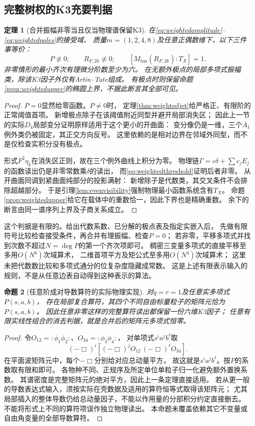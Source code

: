 \documentclass[11pt,a4paper]{ctexart}
\theoremstyle{cnplain}\newtheorem{theorem}{定理}[section]
\newtheorem{proposition}[theorem]{命题}
\theoremstyle{definition}\newtheorem{definition}[theorem]{定义}
\theoremstyle{remark}\newtheorem{remark}[theorem]{注}
\begin{document}
\subsection{完整树权的K3充要判据}
\begin{theorem}[合并振幅非零当且仅当物理谱保留K3]\label{thm:weightediff}
在\eqref{eq:weightedamplitude}--\eqref{eq:weightedpoles}的接受域、
质量$m=(1,2,4,8)$及任意正偶数维下，以下三件事等价：
\[
 P\not\equiv0;\qquad
 R_{F,2k}\not\equiv0;\qquad
 [M_{\mathrm{fun}}(R_{F,2k}):T_X]=1.
\]
非零情形的最小齐次有理微分阶数至少为六。
在无额外极点的局部多项式振幅类，除该K3因子外仅有Artin--Tate组成。
有极点时则保留命题\ref{prop:weightedupper}的椭圆上界，不据此断言其全部可见。
\end{theorem}
\begin{proof}
$P=0$显然给零函数。$P\ne0$时，
定理\ref{thm:weightedjet}给严格正、有限阶的正常阈值首项。
新增极点除子在该阈值附近同型并避开局部消失区；
因此上一节的实际$D_4$局部变分证明原样适用于这个更小的开曲面：
变分像仍是一维，三个$A_1$例外类仍被固定，其正交方向反号。
这里依赖的是相对边界在邻域外同型，而不是仅检查实积分没有极点。

形式$F^2\eta_k$在消失区正则，故在三个例外曲线上积分为零。
物理链$\Gamma=c\delta+\sum c_jE_j$的函数读出仍是非零常数乘$\delta$的读出，
而\eqref{eq:weightedthreshold}证明后者非零。
从开曲面同调到紧曲面纯部分的投影满射：
新增除子是代数类，其交叉条件不会排除超越部分。
于是引理\ref{lem:evenvisibility}强制物理最小函数系统含有$T_X$。
命题\ref{prop:weightedupper}给它在载体中的重数恰一，因此下界也是精确重数。
余下的断言由同一谱序列上界及子商关系成立。
\end{proof}

这个判据是有限的。给出代数系数、已分解的极点表及指定实嵌入后，
先做有限符号比较检查接受条件，再合并有理振幅、检查$P=0$；
若非零，平移多项式并找到次数不超过$N=\deg P$的第一个齐次项即可。
稠密三变量多项式的直接平移至多用$O(N^6)$次域算术，
二维首项平方及矩公式至多用$O(N^4)$次域算术；
这里未把代数数比较和多项式通分的位复杂度隐藏成常数。
这是上述有限表示输入的规则，不是从任意边表自动得到这种表示的算法。

\begin{proposition}[任意阶成对导数算符的实际物理实现]\label{prop:weightedoperator}
对$q=r=1$及任意实多项式$P(s,a,b)$，
存在局部复合算符，其四个不同自由标量粒子的矩阵元恰为$P(s,a,b)$。
因此任意非零这样的完整算符读出都保留一份六维K3因子；
任意有限实线性组合的消去判据，就是合并后的矩阵元多项式恒零。
\end{proposition}
\begin{proof}
令$O_{12}=:\!\phi_1\phi_2\!:$、$O_{34}=:\!\phi_3\phi_4\!:$，
对单项式$s^ia^jb^\ell$取
\[
 (-\Box)^i\left[(-\Box)^j O_{12}\,(-\Box)^\ell O_{34}\right].
\]
在平面波矩阵元中，每个$-\Box$分别给对应总动量平方，
故这就是$s^ia^jb^\ell$。按$P$的系数取有限和即可。
各物种不同、正规序及所定单位单粒子归一化避免额外置换系数。
其谱密度是完整矩阵元的绝对平方，因此上一条定理直接适用。
若从更一般的导数表达式输入，须按实际在壳数据及适用的算符恒等式取得该矩阵元；
尤其局部插入的整体导数仍给总动量因子，不能以作用量的分部积分约定直接删去。
不能将形式上不同的算符项误作独立物理读出。
本命题未覆盖依赖其它不变量或自由角变量的全部导数算符。
\end{proof}
\end{document}
